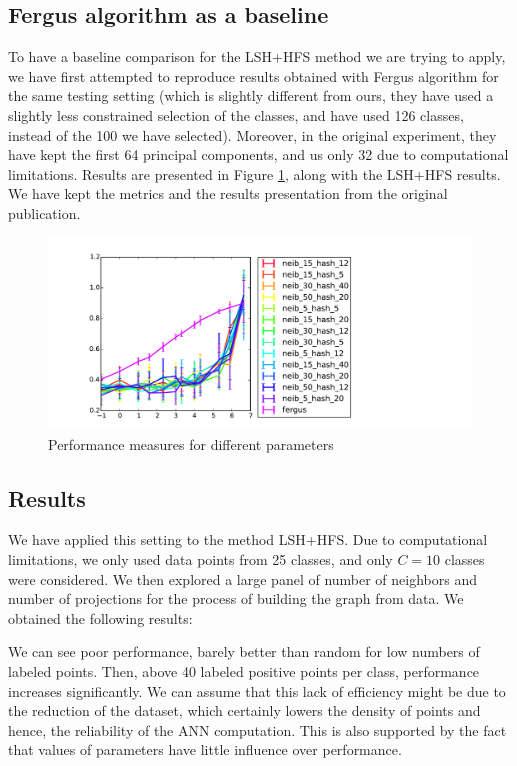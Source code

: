 \documentclass{article} %
\begin{document}
\subsection{Fergus algorithm as a baseline}
To have a baseline comparison for the LSH+HFS method we are trying to apply, we have first attempted to reproduce results obtained with Fergus algorithm for the same testing setting (which is slightly different from ours, they have used a slightly less constrained selection of the classes, and have used 126 classes, instead of the 100 we have selected). Moreover, in the original experiment, they have kept the first 64 principal components, and us only 32 due 
to computational limitations. Results are presented in Figure \ref{variation}, along with the LSH+HFS results. We have kept the metrics and the results presentation from the original publication.

\begin{figure}[!h]
  \hspace{-3cm}
  \includegraphics[width=1.8\textwidth]{method_comp.pdf}
  \caption{Performance measures for different parameters}
  \label{variation}
\end{figure}

\subsection{Results}
We have applied this setting to the method LSH+HFS. Due to computational limitations, we only used data points from 25 classes, and only $C=10$ classes were considered. We then explored a large panel of number of neighbors and number of projections for the process of building the graph from data. We obtained the following results:



We can see poor performance, barely better than random for low numbers of labeled points. Then, above 40 labeled positive points per class, performance increases significantly. We can assume that this lack of efficiency might be due to the reduction of the dataset, which certainly lowers the density of points and hence, the reliability of the ANN computation. This is also supported by the fact that values of parameters have little influence over performance. 
\end{document}
